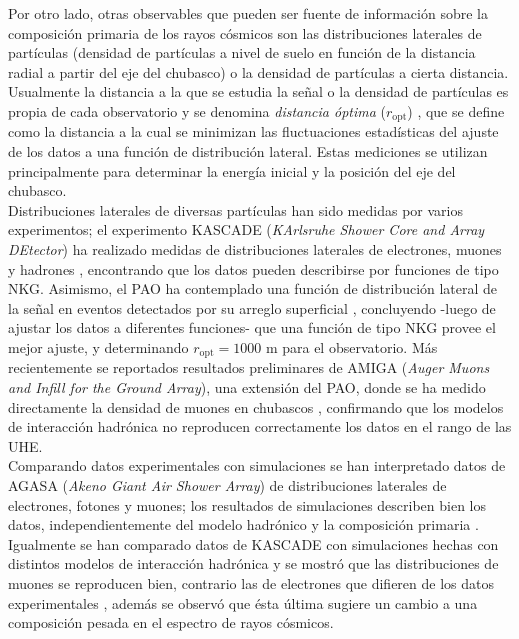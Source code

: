 Por otro lado, otras observables que pueden ser fuente de información sobre la composición primaria de los rayos cósmicos son las distribuciones laterales de partículas (densidad de partículas a nivel de suelo en función de la distancia radial a partir del eje del chubasco) o la densidad de partículas a cierta distancia. Usualmente la distancia a la que se estudia la señal o la densidad de partículas es propia de cada observatorio y se denomina \textit{distancia óptima} ($r_{\text{opt}}$) \cite{Newton2007}, que se define como la distancia a la cual se minimizan las fluctuaciones estadísticas del ajuste de los datos a una función de distribución lateral. Estas mediciones se utilizan principalmente para determinar la energía inicial y la posición del eje del chubasco. \\

Distribuciones laterales de diversas partículas han sido medidas por varios experimentos; el experimento KASCADE (\textit{KArlsruhe Shower Core and Array DEtector}) ha realizado medidas de distribuciones laterales de electrones, muones y hadrones \cite{Antoni2001}, encontrando que los datos pueden describirse por funciones de tipo NKG. Asimismo, el PAO ha contemplado una función de distribución lateral de la señal en eventos detectados por su arreglo superficial \cite{Barnhill2005}, concluyendo -luego de ajustar los datos a diferentes funciones- que una función de tipo NKG provee el mejor ajuste, y determinando $r_{\text{opt}} = 1000$ m para el observatorio. Más recientemente se reportados resultados preliminares de AMIGA (\textit{Auger Muons and Infill for the Ground Array}), una extensión del PAO, donde se ha medido directamente la densidad de muones en chubascos \cite{Muller2019}, confirmando que los modelos de interacción hadrónica no reproducen correctamente los datos en el rango de las UHE. \\

Comparando datos experimentales con simulaciones se han interpretado datos de AGASA (\textit{Akeno Giant Air Shower Array}) de distribuciones laterales de electrones, fotones y muones; los resultados de simulaciones describen bien los datos, independientemente del modelo hadrónico y la composición primaria \cite{Nagano2000}. Igualmente se han comparado datos de KASCADE con simulaciones hechas con distintos modelos de interacción hadrónica y se mostró que las distribuciones de muones se reproducen bien, contrario  las de electrones que difieren de los datos experimentales \cite{Apel2005}, además se observó que ésta última sugiere un cambio a una composición pesada en el espectro de rayos cósmicos. \\

